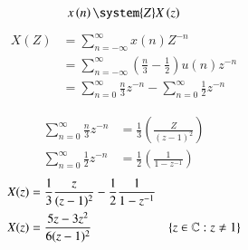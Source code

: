 \documentclass[journal,12pt,twocolumn]{IEEEtran}
\begin{document}
\begin{align}
x \brak{n} \system{Z} X \brak{z}
\end{align}
\begin{align}
X(Z) &= \sum_{n = -\infty}^{\infty} x(n) Z^{-n} \\
 &= \sum_{n = -\infty}^{\infty} (\frac{n}{3} - \frac{1}{2})  u(n)  z^{-n} \\
 &= \sum_{n=0}^{\infty} \frac{n}{3}  z^{-n} - \sum_{n=0}^{\infty} \frac{1}{2}  z^{-n}
\end{align}

\begin{align} \sum_{n=0}^{\infty} \frac{n}{3}  z^{-n} &= \frac{1}{3}  \left(\frac{Z}{(z-1)^{2}}\right) \\
\sum_{n=0}^{\infty} \frac{1}{2}  z^{-n} &=  \frac{1}{2}  \left(\frac{1}{1- z^{-1}}\right)
\end{align}
\begin{align}
X(z) &= \frac{1}{3}  \frac{z}{(z-1)^{2}} - \frac{1}{2}  \frac{1}{1-z^{-1}} \\
X(z) &= {\frac{5z-3 z^{2}}{6(z-1)^{2}}}&\left\{z\in\mathbb{C} : z \neq 1\right\}
\end{align}

\end{document}
